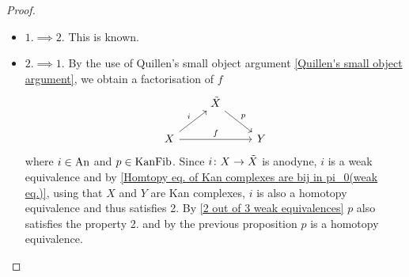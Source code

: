 \begin{proof}
\leavevmode
    \begin{itemize}[label={}]
        \item 
        $1. \implies 2.$ This is known.
        \item 
        $2. \implies 1.$
        By the use of Quillen's small object argument \cref{Quillen's small object argument}, we obtain a factorisation of $f$
        \[
        \begin{tikzcd}
            &
            \Tilde{X}
            \ar[rd, "p"]
            &
            \\
            X
            \ar[ru, "i"]
            \ar[rr, "f"]
            &&
            Y
        \end{tikzcd}
        \]
        where $i \in \operatorname{An}$ and $p \in \operatorname{KanFib}$. 
        Since $i\colon X \to \Tilde{X}$ is anodyne, $i$ is a weak equivalence and by \cref{Homtopy eq. of Kan complexes are bij in pi_0(weak eq.)}, using that $X$ and $Y$ are Kan complexes, $i$ is also a homotopy equivalence and thus satisfies 2.
        By \cref{2 out of 3 weak equivalences} $p$ also satisfies the property 2. and by the previous proposition $p$ is a homotopy equivalence.        
    \end{itemize}    
\end{proof}
